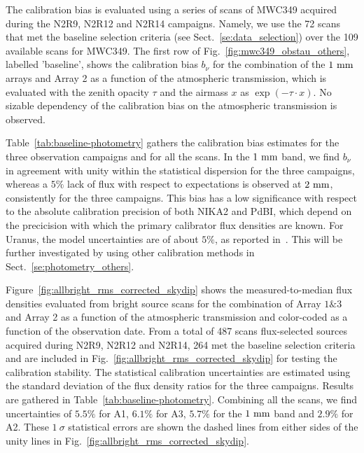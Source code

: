 The calibration bias is evaluated using a
series of scans of MWC349 acquired during the N2R9, N2R12 and N2R14
campaigns. Namely, we use the 72 scans that met the baseline selection
criteria (see Sect.~\ref{se:data_selection}) over the 109 available
scans for MWC349. The first row of
Fig.~\ref{fig:mwc349_obstau_others}, labelled 'baseline', shows the
calibration bias $b_{\nu}$ for the combination of the $1~\rm{mm}$ arrays and
Array 2 as a function of the atmospheric transmission, which is
evaluated with the zenith opacity $\tau$ and the airmass $x$ as
$\exp \left( - \tau \cdot x \right)$. No sizable dependency of the
calibration bias on the atmospheric transmission is observed. 

Table~\ref{tab:baseline-photometry} gathers the calibration bias
estimates for the three observation campaigns and for all the scans.
In the $1~\rm{mm}$ band, we find
$b_\nu$ in agreement with unity within the statistical dispersion for
the three campaigns,
whereas a $5\%$ lack of flux with respect to expectations is observed
at $2~\rm{mm}$, consistently for the three campaigns. This bias has a
low significance with respect to the absolute calibration precision of
both NIKA2 and PdBI, which depend on the precicision with which the
primary calibrator flux densities are known. For Uranus, the model
uncertainties are of about $5\%$, as reported
in~\citet{Morenothesis,Bendo2013}. This will be further investigated
by using other calibration methods in Sect.~\ref{se:photometry_others}.

Figure~\ref{fig:allbright_rms_corrected_skydip} shows the
measured-to-median flux densities evaluated from bright source scans
for the combination of Array $1\&3$ and Array 2 as a function of the
atmospheric transmission and color-coded as a function of the
observation date. From a total of 487 scans
flux-selected sources acquired during N2R9, N2R12 and N2R14, 264 met
the baseline selection criteria and are included in
Fig.~\ref{fig:allbright_rms_corrected_skydip} for testing the
calibration stability. The statistical calibration uncertainties are
estimated using the standard deviation of the flux density ratios for
the three campaigns. Results are gathered in
Table~\ref{tab:baseline-photometry}.
Combining all the scans, we find uncertainties of $5.5\%$ for A1,
$6.1\%$ for A3, $5.7\%$ for the $1~\rm{mm}$ band and $2.9\%$ for A2.
These $1~\sigma$ statistical errors are shown the dashed lines from
either sides of the unity lines in
Fig.~\ref{fig:allbright_rms_corrected_skydip}.



